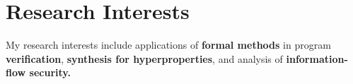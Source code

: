 

\section{Research Interests}

My research interests include applications of {\bf formal methods} in program {\bf verification}, 
{\bf synthesis for hyperproperties}, and analysis of {\bf information-flow security.}


